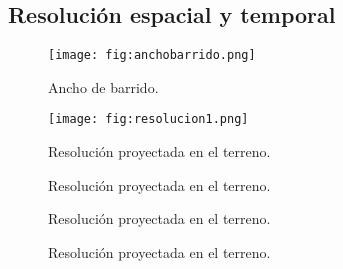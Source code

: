 \subsection{Resolución espacial y temporal}

\begin{frame}{}
  \begin{figure}
    \centering
    \texttt{[image: fig:anchobarrido.png]}
    \caption{Ancho de barrido.}
    \label{}
  \end{figure}
\end{frame}

\begin{frame}{}
  \begin{figure}
    \centering
    \texttt{[image: fig:resolucion1.png]}
    \caption{Resolución proyectada en el terreno.}
    \label{}
  \end{figure}
\end{frame}




\begin{frame}{}
  \begin{figure}
    \centering
    \caption{Resolución proyectada en el terreno.}
    \label{}
  \end{figure}
\end{frame}

\begin{frame}{}
  \begin{figure}
    \centering
    \caption{Resolución proyectada en el terreno.}
    \label{}
  \end{figure}
\end{frame}

\begin{frame}{}
  \begin{figure}
    \centering
    \caption{Resolución proyectada en el terreno.}
    \label{}
  \end{figure}
\end{frame}


